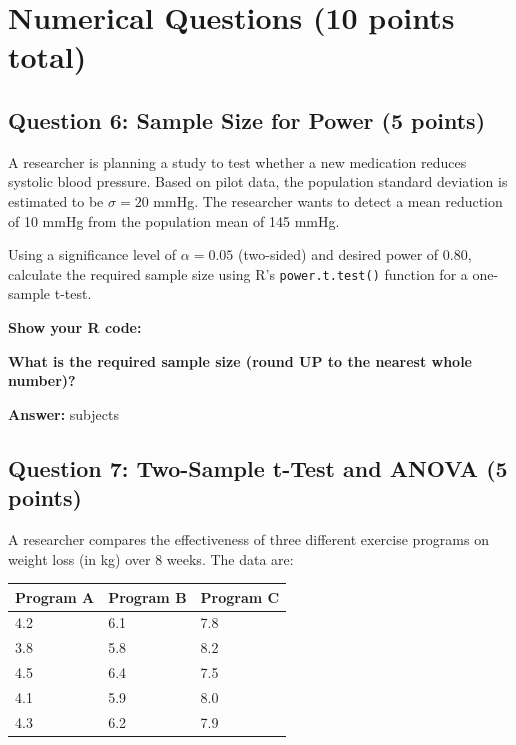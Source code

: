 \documentclass[11pt]{article}
\begin{document}
\newpage

\section{Numerical Questions (10 points total)}

\subsection*{Question 6: Sample Size for Power (5 points)}

A researcher is planning a study to test whether a new medication reduces systolic blood pressure. Based on pilot data, the population standard deviation is estimated to be $\sigma = 20$ mmHg. The researcher wants to detect a mean reduction of 10 mmHg from the population mean of 145 mmHg.

\vspace{0.3cm}

Using a significance level of $\alpha = 0.05$ (two-sided) and desired power of 0.80, calculate the required sample size using R's \texttt{power.t.test()} function for a one-sample t-test.

\vspace{0.3cm}

\textbf{Show your R code:}

\vspace{3cm}

\textbf{What is the required sample size (round UP to the nearest whole number)?}

\vspace{0.3cm}

\textbf{Answer:} \underline{\hspace{3cm}} subjects

\vspace{1cm}

\subsection*{Question 7: Two-Sample t-Test and ANOVA (5 points)}

A researcher compares the effectiveness of three different exercise programs on weight loss (in kg) over 8 weeks. The data are:

\vspace{0.3cm}

\begin{center}
\begin{tabular}{lll}
\toprule
Program A & Program B & Program C \\
\midrule
4.2 & 6.1 & 7.8 \\
3.8 & 5.8 & 8.2 \\
4.5 & 6.4 & 7.5 \\
4.1 & 5.9 & 8.0 \\
4.3 & 6.2 & 7.9 \\
\bottomrule
\end{tabular}
\end{center}
\end{document}
